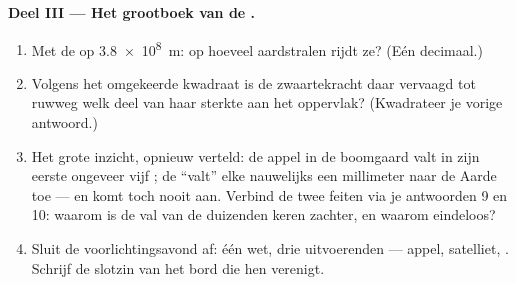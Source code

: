 \begin{problem}
\medskip\noindent\textbf{Deel III --- Het grootboek van de
.}
\begin{enumerate}[resume]
  \item Met de  op \qty{3.8e8}{m}: op hoeveel aardstralen
        rijdt ze? (Eén decimaal.)
  \item Volgens het omgekeerde kwadraat is de zwaartekracht daar
        vervaagd tot ruwweg welk deel van haar sterkte aan het
        oppervlak? (Kwadrateer je vorige antwoord.)
  \item Het grote inzicht, opnieuw verteld: de appel in de boomgaard
        valt in zijn eerste  ongeveer vijf ; de
         ``valt'' elke  nauwelijks een millimeter naar
        de Aarde toe --- en komt toch nooit aan. Verbind de twee feiten
        via je antwoorden 9 en 10: waarom is de val van de
         duizenden keren zachter, en waarom eindeloos?
  \item Sluit de voorlichtingsavond af: één wet, drie uitvoerenden ---
        appel, satelliet, . Schrijf de slotzin van het bord
        die hen verenigt.
\end{enumerate}
\end{problem}

